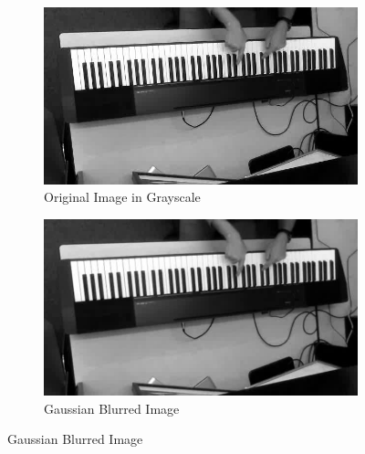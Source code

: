 \documentclass[10pt,twocolumn,letterpaper]{article}
\begin{document}
\begin{figure}[h!]
  \begin{subfigure}{0.24\textwidth}
  \includegraphics[width=\linewidth]{fig/1.jpg}
  \caption{Original Image in Grayscale} \label{fig:a}
  \end{subfigure}\hspace*{\fill}
  \begin{subfigure}{0.24\textwidth}
  \includegraphics[width=\linewidth]{fig/3.jpg}
  \caption{Gaussian Blurred Image} \label{fig:b}
  \end{subfigure}


\end{figure}
\end{document}
